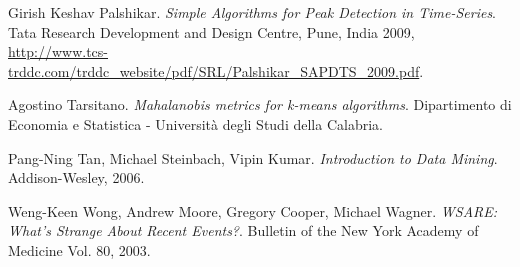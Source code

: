 \documentclass[12pt,a4paper,cucitura]{toptesi}
\begin{document}
\begin{thebibliography}{99}
Girish Keshav Palshikar.
\emph{Simple Algorithms for Peak Detection in Time-Series}.
Tata Research Development and Design Centre, Pune, India 2009,
\url{http://www.tcs-trddc.com/trddc_website/pdf/SRL/Palshikar_SAPDTS_2009.pdf}.

Agostino Tarsitano.
\emph{Mahalanobis metrics for k-means algorithms}.
Dipartimento di Economia e Statistica - Università degli Studi della Calabria.

Pang-Ning Tan,
Michael Steinbach,
Vipin Kumar.
\emph{Introduction to Data Mining}.
Addison-Wesley,
2006.

Weng-Keen Wong,
Andrew Moore,
Gregory Cooper,
Michael Wagner. 
\emph{WSARE: What’s Strange About Recent Events?}.
Bulletin of the New York Academy of Medicine Vol. 80, 2003.

\end{thebibliography}
\end{document}
